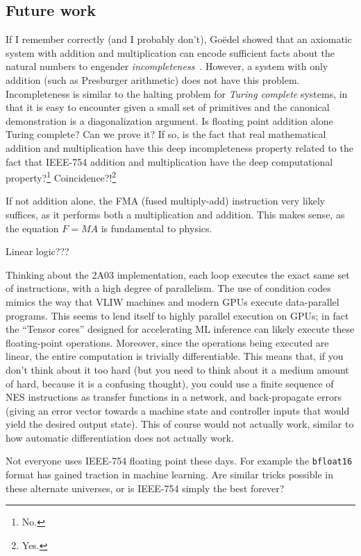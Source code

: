 \documentclass[twocolumn]{article}
\begin{document}
\subsection{Future work}

If I remember correctly (and I probably don't), Go\"edel showed that
an axiomatic system with addition and multiplication can encode
sufficient facts about the natural numbers to engender {\it
  incompleteness}~\cite{goedel1930incompleteness}. However, a system
with only addition (such as Presburger arithmetic) does not have this
problem. Incompleteness is similar to the halting problem for {\it
  Turing complete} systems, in that it is easy to encounter given a
small set of primitives and the canonical demonstration is a
diagonalization argument. Is floating point addition alone Turing
complete? Can we prove it? If so, is the fact that real mathematical
addition and multiplication have this deep incompleteness property
related to the fact that IEEE-754 addition and multiplication have the
deep computational property?\footnote{No.}
Coincidence?!\footnote{Yes.}

If not addition alone, the FMA (fused multiply-add) instruction very
likely suffices, as it performs both a multiplication and addition.
This makes sense, as the equation $F = M\!A$ is fundamental to physics.

\medskip
Linear logic???

\medskip
Thinking about the 2A03 implementation, each loop executes the exact
same set of instructions, with a high degree of parallelism. The use
of condition codes mimics the way that VLIW machines and modern GPUs
execute data-parallel programs. This seems to lend itself to highly
parallel execution on GPUs; in fact the ``Tensor cores'' designed for
accelerating ML inference can likely execute these floating-point
operations. Moreover, since the operations being executed are linear,
the entire computation is trivially differentiable. This means that,
if you don't think about it too hard (but you need to think about it a
medium amount of hard, because it is a confusing thought), you could
use a finite sequence of NES instructions as transfer functions in a
network, and back-propagate errors (giving an error vector towards a
machine state and controller inputs that would yield the desired
output state). This of course would not actually work, similar to how
automatic differentiation does not actually work.

Not everyone uses IEEE-754 floating point these days. For example the
{\tt bfloat16} format has gained traction in machine learning. Are
similar tricks possible in these alternate universes, or is IEEE-754
simply the best forever?
\end{document}

